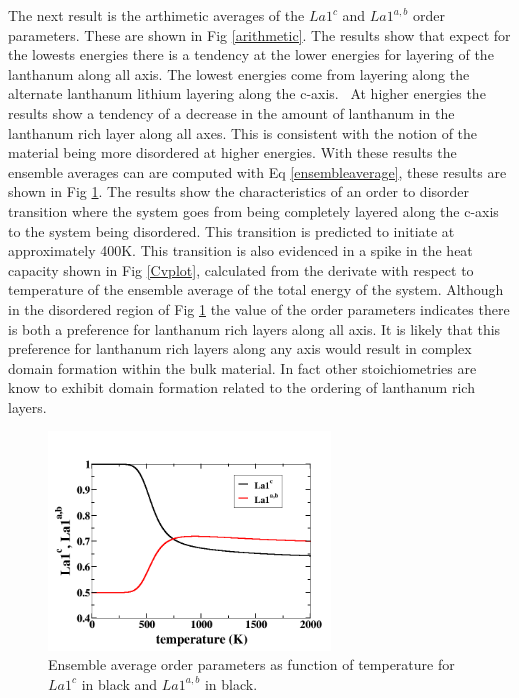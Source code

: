 \documentclass[aps,prl,reprint,superscriptaddress,showkeys]{revtex4-1}
\begin{document}
The next result is the arthimetic averages of the $La1^c$ and $La1^{a,b}$ order parameters. These are shown in Fig \ref{arithmetic}.  The results show that expect for the lowests energies there is a tendency at the lower energies for layering of the lanthanum along all axis. The lowest energies come from layering along the alternate lanthanum lithium layering along the c-axis. \  At higher energies the results show a tendency of a decrease in the amount of lanthanum in the lanthanum rich layer along all axes.   This is consistent with the notion of the material being more disordered at higher energies. With these results the ensemble averages can are computed with Eq \ref{ensembleaverage}, these results are shown in Fig \ref{ensembleOP}. The results show the characteristics of an order to disorder transition where the system goes from being completely layered along the c-axis to the system being disordered. This transition is predicted to initiate at approximately 400K. This transition is also evidenced in a spike in the heat capacity shown in Fig \ref{Cvplot},  calculated from the derivate with respect to temperature of the ensemble average of the total energy of the system.   Although in the disordered region of Fig \ref{ensembleOP} the value of the order parameters indicates there is both a preference for lanthanum rich layers along all axis. It is likely that this preference for lanthanum rich layers along any axis would result in complex domain formation within the bulk material. In fact other stoichiometries are know to exhibit domain formation related to the ordering of lanthanum rich layers. 

\begin{figure}
\includegraphics[width=7.5cm]{./figures/OP_ensemble_avg.png}
\caption{Ensemble average order parameters as function of temperature for $La1^c$ in black and $La1^{a,b}$ in black. \label{ensembleOP}}
\end{figure}
\end{document}
